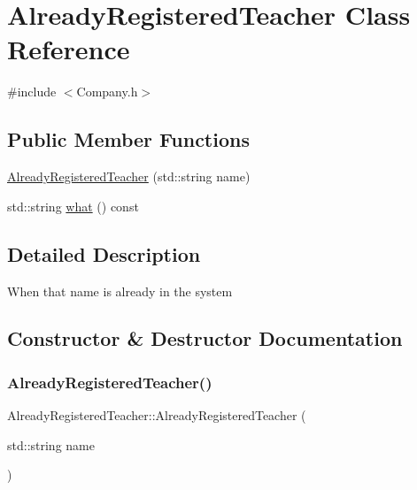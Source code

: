 \hypertarget{class_already_registered_teacher}{}\section{Already\+Registered\+Teacher Class Reference}
\label{class_already_registered_teacher}


{\ttfamily \#include $<$Company.\+h$>$}

\subsection*{Public Member Functions}
\begin{DoxyCompactItemize}
\item 
\mbox{\hyperlink{class_already_registered_teacher_ab6bdaf12fd3147274d10f6595d424a8e}{Already\+Registered\+Teacher}} (std\+::string name)
\item 
std\+::string \mbox{\hyperlink{class_already_registered_teacher_a3d7912fc2aa048ad661db2fa82f17d35}{what}} () const
\end{DoxyCompactItemize}


\subsection{Detailed Description}
When that name is already in the system 

\subsection{Constructor \& Destructor Documentation}
\mbox{\label{class_already_registered_teacher_ab6bdaf12fd3147274d10f6595d424a8e}} 
\subsubsection{\texorpdfstring{Already\+Registered\+Teacher()}{AlreadyRegisteredTeacher()}}
{\footnotesize\ttfamily Already\+Registered\+Teacher\+::\+Already\+Registered\+Teacher (\begin{DoxyParamCaption}\item[{std\+::string}]{name }\end{DoxyParamCaption})\hspace{0.3cm}{\ttfamily [inline]}}



